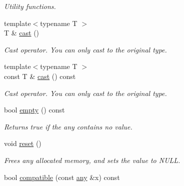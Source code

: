 \begin{DoxyCompactItemize}
\begin{DoxyCompactList}\small\item\em Utility functions. \end{DoxyCompactList}\item 
\mbox{\label{classtrees_1_1any_afc8d23b68e666ef86664459a69255cfc}} 
{\footnotesize template$<$typename T $>$ }\\T \& \hyperlink{classtrees_1_1any_afc8d23b68e666ef86664459a69255cfc}{cast} ()
\begin{DoxyCompactList}\small\item\em Cast operator. You can only cast to the original type. \end{DoxyCompactList}\item 
\mbox{\label{classtrees_1_1any_a63088b3ff9a449b7c5ec82e635aa5b8d}} 
{\footnotesize template$<$typename T $>$ }\\const T \& \hyperlink{classtrees_1_1any_a63088b3ff9a449b7c5ec82e635aa5b8d}{cast} () const
\begin{DoxyCompactList}\small\item\em Cast operator. You can only cast to the original type. \end{DoxyCompactList}\item 
\mbox{\label{classtrees_1_1any_a2bc0c0f86ee6baefd7d9efebad0fdada}} 
bool \hyperlink{classtrees_1_1any_a2bc0c0f86ee6baefd7d9efebad0fdada}{empty} () const
\begin{DoxyCompactList}\small\item\em Returns true if the any contains no value. \end{DoxyCompactList}\item 
\mbox{\label{classtrees_1_1any_ad34b59c202e4c39dc229fe171589ad8a}} 
void \hyperlink{classtrees_1_1any_ad34b59c202e4c39dc229fe171589ad8a}{reset} ()
\begin{DoxyCompactList}\small\item\em Frees any allocated memory, and sets the value to N\+U\+LL. \end{DoxyCompactList}\item 
\mbox{\label{classtrees_1_1any_a249917245dd15894970e51ea4058138e}} 
bool \hyperlink{classtrees_1_1any_a249917245dd15894970e51ea4058138e}{compatible} (const \hyperlink{classtrees_1_1any}{any} \&x) const

\end{DoxyCompactItemize}
